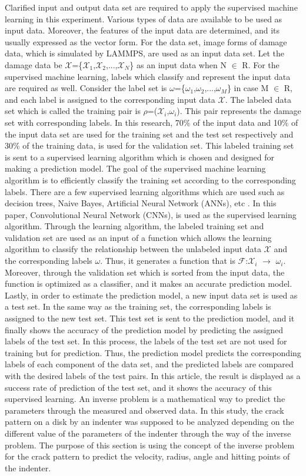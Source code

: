 Clarified input and output data set are required to apply the supervised machine learning in this experiment. Various types of data are available to be used as input data. Moreover, the features of the input data are determined, and its usually expressed as the vector form. For the data set, image forms of damage data, which is simulated by LAMMPS, are used as an input data set. Let the damage data be $\mathcal{X}$=\{$\mathcal{X}_1$,$\mathcal{X}_2$,...,$\mathcal{X}_N$\} as an input data when N $\in$ R. For the supervised machine learning, labels which classify and represent the input data are required as well. Consider the label set is $\omega$=\{$\omega_1$,$\omega_2$,...,$\omega_M$\} in case M $\in$ R, and each label is assigned to the corresponding input data $\mathcal{X}$. The labeled data set which is called the training pair is $\rho$=($\mathcal{X}_i$,$\omega_i$). This pair represents the damage set with corresponding labels. In this research, 70\% of the input data and 10\% of the input data set are used for the training set and the test set respectively and 30\% of the training data, is used for the validation set. This labeled training set is sent to a supervised learning algorithm which is chosen and designed for making a prediction model. The goal of the supervised machine learning algorithm is to efficiently classify the training set according to the corresponding labels. There are a few supervised learning algorithms which are used such as decision trees, Naive Bayes, Artificial Neural Network (ANNs), etc \cite{Ref18}. In this paper, Convolutional Neural Network (CNNs), is used as the supervised learning algorithm. Through the learning algorithm, the labeled training set and validation set are used as an input of a function which allows the learning algorithm to classify the relationship between the unlabeled input data $\mathcal{X}$ and the corresponding labels $\omega$. Thus, it generates a function that is $\mathcal{F}$:$\mathcal{X}_i$ $\rightarrow$ $\omega_i$. Moreover, through the validation set which is sorted from the input data, the function is optimized as a classifier, and it makes an accurate prediction model. Lastly, in order to estimate the prediction model, a new input data set is used as a test set. In the same way as the training set, the corresponding labels is assigned to the new test set. This test set is sent to the prediction model, and it finally shows the accuracy of the prediction model by predicting the assigned labels of the test set. In this process, the labels of the test set are not used for training but for prediction. Thus, the prediction model predicts the corresponding labels of each component of the data set, and the predicted labels are compared with the desired labels of the test pairs. In this article, the result is displayed as a success rate of prediction of the test set, and it shows the accuracy of this supervised learning. An inverse problem is a mathematical way to predict the parameters through the measured and observed data. In this study, the crack pattern on a disk by an indenter was supposed to be analyzed depending on the different value of the parameters of the indenter through the way of the inverse problem. The purpose of this section is using the concept of the inverse problem for the crack pattern to predict the velocity, radius, angle and hitting points of the indenter.
